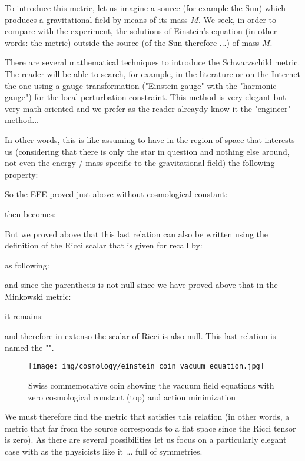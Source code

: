 	To introduce this metric, let us imagine a source (for example the Sun) which produces a gravitational field by means of its mass $M$. We seek, in order to compare with the experiment, the solutions of Einstein's equation (in other words: the metric) outside the source (of the Sun therefore ...) of mass $M$.
	\begin{tcolorbox}[title=Remark,colframe=black,arc=10pt]
	There are several mathematical techniques to introduce the Schwarzschild metric. The reader will be able to search, for example, in the literature or on the Internet the one using a gauge transformation ("Einstein gauge" with the "harmonic gauge") for the local perturbation constraint. This method is very elegant but very math oriented and we prefer as the reader alreaydy know it the "engineer" method...
	\end{tcolorbox}
	In other words, this is like assuming to have in the region of space that interests us (considering that there is only the star in question and nothing else around, not even the energy / mass specific to the gravitational field) the following property:
	
	So the EFE proved just above without cosmological constant:
	
	then becomes:
	
	But we proved above that this last relation can also be written using the definition of the Ricci scalar that is given for recall by:
	
	as following:
	
	and since the parenthesis is not null since we have proved above that in the Minkowski metric:
	
	it remains:
	
	and therefore in extenso the scalar of Ricci is also null. This last relation is named the "".
	\begin{figure}[H]
		\centering
		\texttt{[image: img/cosmology/einstein\_coin\_vacuum\_equation.jpg]}	
		\caption{Swiss commemorative coin showing the vacuum field equations with zero cosmological constant (top) and action minimization}
	\end{figure}
	We must therefore find the metric that satisfies this relation (in other words, a metric that far from the source corresponds to a flat space since the Ricci tensor is zero). As there are several possibilities let us focus on a particularly elegant case with as the physicists like it ... full of symmetries.

